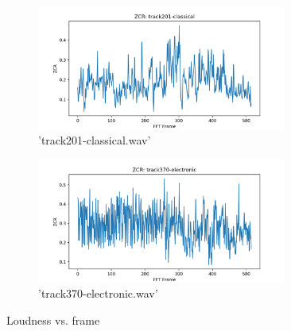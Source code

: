 \documentclass[11pt,a4paper]{article}
\begin{document}
\begin{figure}[tb]
	\centering
	\begin{subfigure}[t]{\hsize}
		\centering
		\includegraphics[width=0.9\textwidth]{zcr_track201-classical}
		\caption{'track201-classical.wav'}
		\label{fig:zcr_classical}
	\end{subfigure}
	\begin{subfigure}[t]{\hsize}
		\centering
		\includegraphics[width=0.9\textwidth]{zcr_track370-electronic}
		\caption{'track370-electronic.wav'}
		\label{fig:zcr_electronic}
	\end{subfigure}
	\caption{Loudness vs. frame \label{fig:zcr}}
\end{figure}
\clearpage
\end{document}
